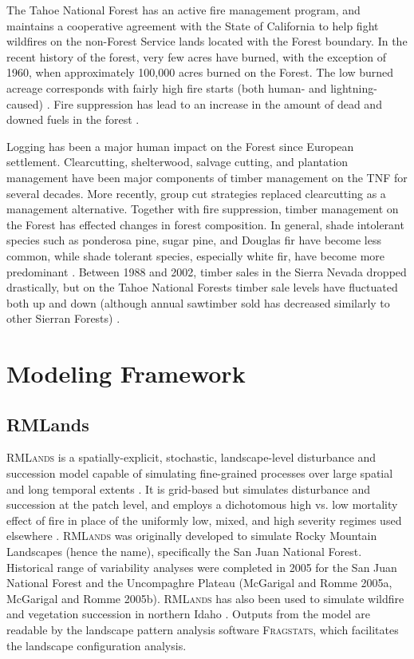 The Tahoe National Forest has an active fire management program, and maintains a cooperative agreement with the State of California to help fight wildfires on the non-Forest Service lands located with the Forest boundary. In the recent history of the forest, very few acres have burned, with the exception of 1960, when approximately 100,000 acres burned on the Forest. The low burned acreage corresponds with fairly high fire starts (both human- and lightning-caused) \citep{USDAForestService1990}. Fire suppression has lead to an increase in the amount of dead and downed fuels in the forest \citep{USDAForestService2004}.

Logging has been a major human impact on the Forest since European settlement. Clearcutting, shelterwood, salvage cutting, and plantation management have been major components of timber management on the TNF for several decades. More recently, group cut strategies replaced clearcutting as a management alternative. Together with fire suppression, timber management on the Forest has effected changes in forest composition. In general, shade intolerant species such as ponderosa pine, sugar pine, and Douglas fir have become less common, while shade tolerant species, especially white fir, have become more predominant \citep{USDAForestService1990}. Between 1988 and 2002, timber sales in the Sierra Nevada dropped drastically, but on the Tahoe National Forests timber sale levels have fluctuated both up and down (although annual sawtimber sold has decreased similarly to other Sierran Forests) \citep{USDAForestService2004}.


\section{Modeling Framework}
\label{sec:modelframe}

\subsection{RMLands}
\textsc{RMLands} is a spatially-explicit, stochastic, landscape-level disturbance and succession model capable of simulating fine-grained processes over large spatial and long temporal extents \citep{McGarigal2005}. It is grid-based but simulates disturbance and succession at the patch level, and employs a dichotomous high vs. low mortality effect of fire in place of the uniformly low, mixed, and high severity regimes used elsewhere \citep{McGarigal2012}. \textsc{RMLands} was originally developed to simulate Rocky Mountain Landscapes (hence the name), specifically the San Juan National Forest. Historical range of variability analyses were completed in 2005 for the San Juan National Forest and the Uncompaghre Plateau (McGarigal and Romme 2005a, McGarigal and Romme 2005b). \textsc{RMLands} has also been used to simulate wildfire and vegetation succession in northern Idaho \citep{Cushman2011}. Outputs from the model are readable by the landscape pattern analysis software \textsc{Fragstats}, which facilitates the landscape configuration analysis.


